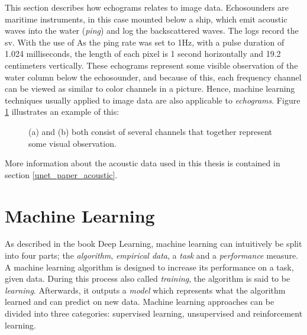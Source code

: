     This section describes how echograms relates to image data. Echosounders are maritime instruments, in this case mounted below a ship, which emit acoustic waves into the water (\textit{ping}) and log the backscattered waves. The logs record the \gls{sv}. With the use of   As the ping rate was set to 1Hz\cite{choi2021semi}, with a pulse duration of 1.024 milliseconds, the length of each pixel is 1 second horizontally and 19.2 centimeters vertically. These echograms represent some visible observation of the water column below the echosounder, and because of this, each frequency channel can be viewed as similar to color channels in a picture. Hence, machine learning techniques usually applied to image data are also applicable to \textit{echograms}. Figure \ref{accoustic data and color channels fig} illustrates an example of this:
    
    
        \begin{figure}[H]
        \centering
        
        
        
        
        \caption[Frequency channels and color channels]{(a) and (b) both consist of several channels that together represent some visual observation.}
        \label{accoustic data and color channels fig}
        
        \end{figure}
    
    More information about the acoustic data used in this thesis is contained in section \ref{unet_paper_acoustic}. 
\clearpage
\section{Machine Learning} \label{Machine Learning}
    As described in the book Deep Learning\cite{Goodfellow-et-al-2016_ML}, machine learning can intuitively be split into four parts; the \textit{algorithm}, \textit{empirical data}, a \textit{task} and a \textit{performance} measure. A machine learning algorithm is designed to increase its performance on a task, given data. During this process also called \textit{training}, the algorithm is said to be \textit{learning}. Afterwards, it outputs a \textit{model} which represents what the algorithm learned and can predict on new data. Machine learning approaches can be divided into three categories\cite{Goodfellow-et-al-2016_E}: supervised learning, unsupervised and reinforcement learning. 
    
